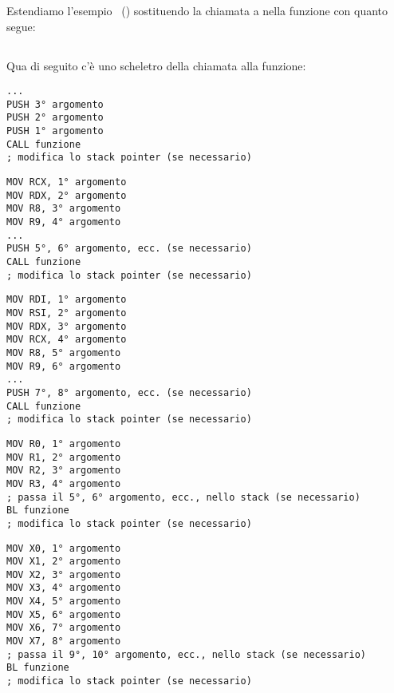 \mysection{\PrintfSeveralArgumentsSectionName}

Estendiamo l'esempio \emph{\HelloWorldSectionName}~() sostituendo la chiamata a \printf
nella funzione \main con quanto segue:







\subsection{\Conclusion{}}

Qua di seguito c'è uno scheletro della chiamata alla funzione:

\begin{lstlisting}[caption=x86,style=customasmx86]
...
PUSH 3° argomento
PUSH 2° argomento
PUSH 1° argomento
CALL funzione
; modifica lo stack pointer (se necessario)
\end{lstlisting}

\begin{lstlisting}[caption=x64 (MSVC),style=customasmx86]
MOV RCX, 1° argomento
MOV RDX, 2° argomento
MOV R8, 3° argomento
MOV R9, 4° argomento
...
PUSH 5°, 6° argomento, ecc. (se necessario)
CALL funzione
; modifica lo stack pointer (se necessario)
\end{lstlisting}

\begin{lstlisting}[caption=x64 (GCC),style=customasmx86]
MOV RDI, 1° argomento
MOV RSI, 2° argomento
MOV RDX, 3° argomento
MOV RCX, 4° argomento
MOV R8, 5° argomento
MOV R9, 6° argomento
...
PUSH 7°, 8° argomento, ecc. (se necessario)
CALL funzione
; modifica lo stack pointer (se necessario)
\end{lstlisting}

\begin{lstlisting}[caption=ARM,style=customasmARM]
MOV R0, 1° argomento
MOV R1, 2° argomento
MOV R2, 3° argomento
MOV R3, 4° argomento
; passa il 5°, 6° argomento, ecc., nello stack (se necessario)
BL funzione
; modifica lo stack pointer (se necessario)
\end{lstlisting}

\begin{lstlisting}[caption=ARM64,style=customasmARM]
MOV X0, 1° argomento
MOV X1, 2° argomento
MOV X2, 3° argomento
MOV X3, 4° argomento
MOV X4, 5° argomento
MOV X5, 6° argomento
MOV X6, 7° argomento
MOV X7, 8° argomento
; passa il 9°, 10° argomento, ecc., nello stack (se necessario)
BL funzione
; modifica lo stack pointer (se necessario)
\end{lstlisting}

